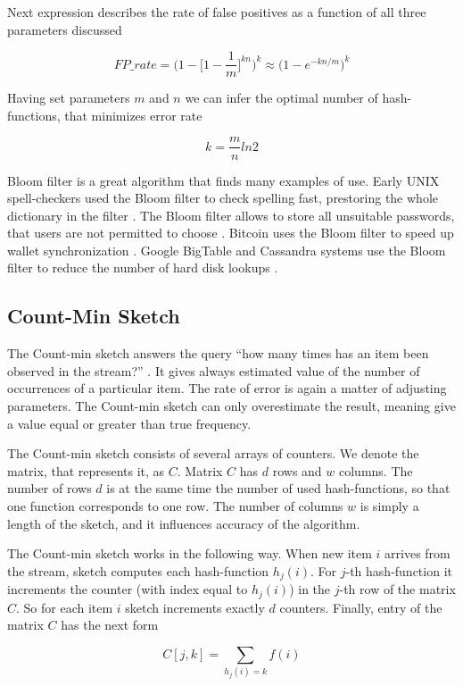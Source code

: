 Next expression describes the rate of false positives as a function of all three parameters discussed

$$
FP\_rate = \Bigg(1 - \Bigg[1 - \frac{1}{m}\Bigg]^{kn}\Bigg)^k \approx \Big(1 - e^{-kn/m}\Big)^k
$$

Having set parameters $m$ and $n$ we can infer the optimal number of hash-functions, that minimizes error rate

$$
k = \frac{m}{n}ln2
$$

Bloom filter is a great algorithm that finds many examples of use.
Early UNIX spell-checkers used the Bloom filter to check spelling fast, prestoring the whole dictionary in the filter \cite{BroderMitzenmacher2005}.
The Bloom filter allows to store all unsuitable passwords, that users are not permitted to choose \cite{BroderMitzenmacher2005}.
Bitcoin uses the Bloom filter to speed up wallet synchronization \cite{BitcoinFoundation2012}.
Google BigTable and Cassandra systems use the Bloom filter to reduce the number of hard disk lookups \cite{Bigtable/Chang_Dean_Ghemawat}.

\subsection{Count-Min Sketch}

The Count-min sketch answers the query ``how many times has an item been observed in the stream?'' \cite{Cormode}.
It gives always estimated value of the number of occurrences of a particular item.
The rate of error is again a matter of adjusting parameters.
The Count-min sketch can only overestimate the result, meaning give a value equal or greater than true frequency.

The Count-min sketch consists of several arrays of counters.
We denote the matrix, that represents it, as $C$.
Matrix $C$ has $d$ rows and $w$ columns.
The number of rows $d$ is at the same time the number of used hash-functions, so that one function corresponds to one row.
The number of columns $w$ is simply a length of the sketch, and it influences accuracy of the algorithm.

The Count-min sketch works in the following way.
When new item $i$ arrives from the stream, sketch computes each hash-function $h_j(i)$.
For $j$-th hash-function it increments the counter (with index equal to $h_j(i)$) in the $j$-th row of the matrix $C$.
So for each item $i$ sketch increments exactly $d$ counters.
Finally, entry of the matrix $C$ has the next form

$$
C[j, k] = \sum_{h_j(i)=k}f(i)
$$

